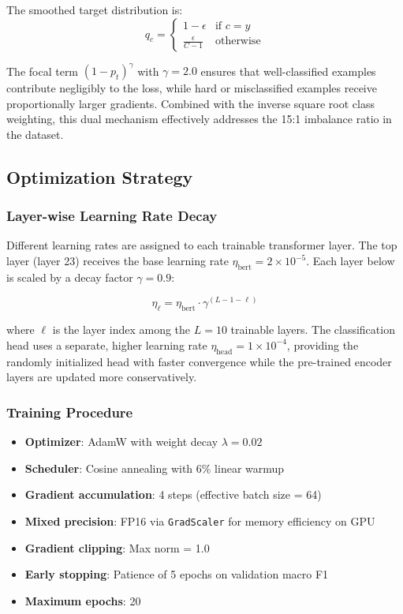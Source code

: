 \documentclass[conference, 10pt]{IEEEtran}
\begin{document}
The smoothed target distribution is:
\begin{equation}
    q_c = \begin{cases}
        1 - \epsilon & \text{if } c = y \\
        \frac{\epsilon}{C - 1} & \text{otherwise}
    \end{cases}
\end{equation}

The focal term $(1 - p_t)^\gamma$ with $\gamma = 2.0$ ensures that well-classified examples contribute negligibly to the loss, while hard or misclassified examples receive proportionally larger gradients. Combined with the inverse square root class weighting, this dual mechanism effectively addresses the 15:1 imbalance ratio in the dataset.

\subsection{Optimization Strategy}

\subsubsection{Layer-wise Learning Rate Decay}
Different learning rates are assigned to each trainable transformer layer. The top layer (layer 23) receives the base learning rate $\eta_{\text{bert}} = 2 \times 10^{-5}$. Each layer below is scaled by a decay factor $\gamma = 0.9$:

\begin{equation}
    \eta_{\ell} = \eta_{\text{bert}} \cdot \gamma^{(L - 1 - \ell)}
    \label{eq:lrdecay}
\end{equation}

where $\ell$ is the layer index among the $L = 10$ trainable layers. The classification head uses a separate, higher learning rate $\eta_{\text{head}} = 1 \times 10^{-4}$, providing the randomly initialized head with faster convergence while the pre-trained encoder layers are updated more conservatively.

\subsubsection{Training Procedure}
\begin{itemize}[noitemsep]
    \item \textbf{Optimizer}: AdamW with weight decay $\lambda = 0.02$
    \item \textbf{Scheduler}: Cosine annealing with 6\% linear warmup
    \item \textbf{Gradient accumulation}: 4 steps (effective batch size = 64)
    \item \textbf{Mixed precision}: FP16 via \texttt{GradScaler} for memory efficiency on GPU
    \item \textbf{Gradient clipping}: Max norm = 1.0
    \item \textbf{Early stopping}: Patience of 5 epochs on validation macro F1
    \item \textbf{Maximum epochs}: 20
\end{itemize}
\end{document}
